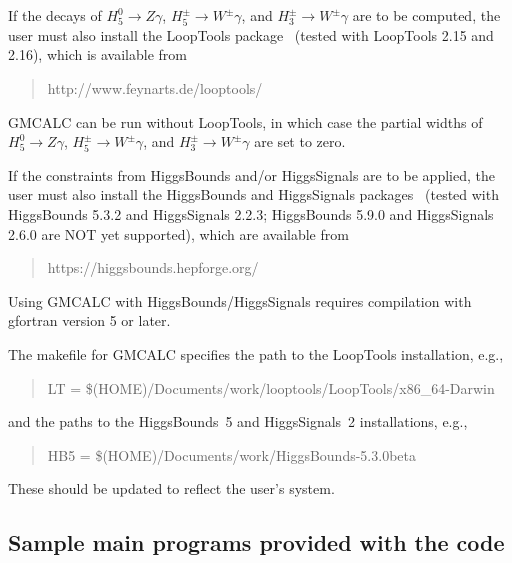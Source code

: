 \documentclass[11pt]{article}
\begin{document}
If the decays of $H_5^0 \to Z\gamma$, $H_5^{\pm} \to W^{\pm} \gamma$, and $H_3^{\pm} \to W^{\pm} \gamma$ are to be computed, the user must also install the LoopTools package~\cite{Hahn:1998yk} (tested with LoopTools 2.15 and 2.16), which is available from
\begin{quote}
	http://www.feynarts.de/looptools/
\end{quote}
GMCALC can be run without LoopTools, in which case the partial widths of $H_5^0 \to Z\gamma$, $H_5^{\pm} \to W^{\pm} \gamma$, and $H_3^{\pm} \to W^{\pm} \gamma$ are set to zero.

If the constraints from HiggsBounds and/or HiggsSignals are to be applied, the user must also install the HiggsBounds and HiggsSignals packages~\cite{Bechtle:2013wla} (tested with HiggsBounds 5.3.2 and HiggsSignals 2.2.3; HiggsBounds 5.9.0 and HiggsSignals 2.6.0 are NOT yet supported), which are available from 
\begin{quote}
	https://higgsbounds.hepforge.org/
\end{quote}
Using GMCALC with HiggsBounds/HiggsSignals requires compilation with gfortran version 5 or later.

The makefile for GMCALC specifies the path to the LoopTools installation, e.g.,
\begin{quote}
	LT = \$(HOME)/Documents/work/looptools/LoopTools/x86\_64-Darwin
\end{quote}
and the paths to the HiggsBounds~5 and HiggsSignals~2 installations, e.g.,
\begin{quote}
	HB5 = \$(HOME)/Documents/work/HiggsBounds-5.3.0beta
\end{quote}
These should be updated to reflect the user's system.  


\subsection{Sample main programs provided with the code}
\end{document}
